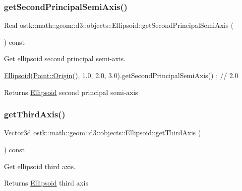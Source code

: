 \subsubsection{\texorpdfstring{get\+Second\+Principal\+Semi\+Axis()}{getSecondPrincipalSemiAxis()}}
{\footnotesize\ttfamily Real ostk\+::math\+::geom\+::d3\+::objects\+::\+Ellipsoid\+::get\+Second\+Principal\+Semi\+Axis (\begin{DoxyParamCaption}{ }\end{DoxyParamCaption}) const}



Get ellipsoid second principal semi-\/axis. 


\begin{DoxyCode}
\hyperlink{classostk_1_1math_1_1geom_1_1d3_1_1objects_1_1_ellipsoid_a106c71abf9503f3d06b2613c1c7e9d65}{Ellipsoid}(\hyperlink{classostk_1_1math_1_1geom_1_1d3_1_1objects_1_1_point_a079c199f08b015d456d02728a71b534c}{Point::Origin}(), 1.0, 2.0, 3.0).getSecondPrincipalSemiAxis() ; \textcolor{comment}{// 2.0}
\end{DoxyCode}


\begin{DoxyReturn}{Returns}
\hyperlink{classostk_1_1math_1_1geom_1_1d3_1_1objects_1_1_ellipsoid}{Ellipsoid} second principal semi-\/axis 
\end{DoxyReturn}
\mbox{\label{classostk_1_1math_1_1geom_1_1d3_1_1objects_1_1_ellipsoid_a2e12dada2181d15c8cf4cef2abf3d2ea}} 
\subsubsection{\texorpdfstring{get\+Third\+Axis()}{getThirdAxis()}}
{\footnotesize\ttfamily Vector3d ostk\+::math\+::geom\+::d3\+::objects\+::\+Ellipsoid\+::get\+Third\+Axis (\begin{DoxyParamCaption}{ }\end{DoxyParamCaption}) const}



Get ellipsoid third axis. 

\begin{DoxyReturn}{Returns}
\hyperlink{classostk_1_1math_1_1geom_1_1d3_1_1objects_1_1_ellipsoid}{Ellipsoid} third axis 
\end{DoxyReturn}
\mbox{\label{classostk_1_1math_1_1geom_1_1d3_1_1objects_1_1_ellipsoid_aa0439388600dc3b6dc93d26402ae2d6d}} 
